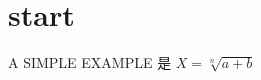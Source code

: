 \documentclass{ctexart}
\begin{document}
\section{start}
A SIMPLE EXAMPLE 是
\(
X=\sqrt[n]{a+b}
\)
\end{document}
